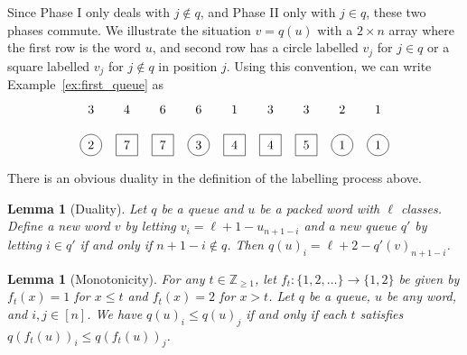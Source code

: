 \documentclass[submission]{FPSAC2018}
\newcommand{\0}{\phantom{c}}
\DeclareMathOperator{\inter}{int} %
\newcommand{\ZZ}{\mathbb{Z}}
\theoremstyle{plain}
\newtheorem{lemma}[thm]{Lemma}
\theoremstyle{definition}
\newtheorem{remark}[thm]{Remark}
\numberwithin{equation}{section}
\newcommand{\darij}[1]{\todo[size=\tiny,color=red!30]{#1 \\ \hfill --- Darij}}
\begin{document}
Since Phase I only deals with $j \notin q$, and Phase II only with $j\in q$, these two phases commute.
We illustrate the situation $v = q(u)$ with a $2 \times n$ array where the first row is the word $u$, and second row has a circle labelled $v_j$ for $j \in q$ or a square labelled $v_j$ for $j \notin q$ in position $j$.
Using this convention, we can write Example~\ref{ex:first_queue} as
\[
\begin{tikzpicture}[baseline=30]
  \foreach \i in {5,9} { \node at (\i,2) {$1$}; }
  \foreach \i in {8} { \node at (\i,2) {$2$}; }
  \foreach \i in {1,6,7} { \node at (\i,2) {$3$}; }
  \foreach \i in {2} { \node at (\i,2) {$4$}; }
  \foreach \i in {3,4} { \node at (\i,2) {$6$}; }
  \foreach \i in {1,4,8,9} { \draw (\i,1) circle (0.3); }
  \foreach \i in {2,3,5,6,7} { \draw (\i-.3,1-.3) rectangle +(0.6,+0.6); }
  \foreach \i in {8,9} { \node at (\i,1) {$1$}; }
  \foreach \i in {1} { \node at (\i,1) {$2$}; }
  \foreach \i in {4} { \node at (\i,1) {$3$}; }
  \foreach \i in {5,6} { \node at (\i,1) {$4$}; }
  \foreach \i in {7} { \node at (\i,1) {$5$}; }
  \foreach \i in {2,3} { \node at (\i,1) {$7$}; }
\end{tikzpicture}
\]

There is an obvious duality in the definition of the labelling process above.

\begin{lemma}[Duality]
  Let $q$ be a queue and $u$ be a packed word with $\ell$ classes.
  Define a new word $v$ by letting $v_i = \ell + 1 - u_{n+1-i}$ and a new queue $q'$ by letting $i \in q'$ if and only if $n+1-i \notin q$.
 Then $q(u)_i = \ell + 2 - q'(v)_{n+1-i}$.
\end{lemma}


\begin{lemma}[Monotonicity]
\label{le:mono}
  For any $t \in \ZZ_{\geq 1}$, let $f_t \colon \{1,2, \ldots\} \to \{1,2\}$ be given by $f_t(x) = 1$ for $x \leq t$ and $f_t(x) = 2$ for $x > t$.
  Let $q$ be a queue, $u$ be any word, and $i,j\in[n]$.
  We have $q(u)_i \leq q(u)_j$ if and only if each $t$ satisfies $q(f_t(u))_i \leq q(f_t(u))_j$.
\end{lemma}
\darij{Why does this hold?}
\end{document}
